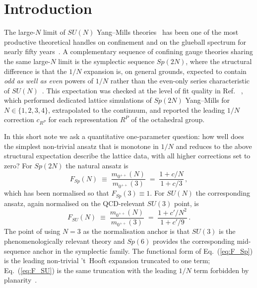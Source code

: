 \documentclass[aps,prd,reprint,nofootinbib,superscriptaddress,floatfix]{revtex4-2}
\begin{document}
\section{Introduction}
The large-$N$ limit of $SU(N)$ Yang--Mills theories~\cite{tHooft1974,Witten1979}
has been one of the most productive theoretical handles on confinement and on
the glueball spectrum for nearly fifty years~\cite{LuciniPanero2013}.
A complementary sequence of confining gauge theories sharing the same large-$N$
limit is the symplectic sequence $Sp(2N)$, where the structural difference is
that the $1/N$ expansion is, on general grounds, expected to contain
\emph{odd as well as even} powers of $1/N$ rather than the even-only series
characteristic of $SU(N)$~\cite{BennettHolligan2021}.
This expectation was checked at the level of fit quality in Ref.~%
\cite{BennettHolligan2021}, which performed dedicated lattice simulations
of $Sp(2N)$ Yang--Mills for $N \in \{1,2,3,4\}$, extrapolated to the
continuum, and reported the leading $1/N$ correction $c_{R^{P}}$ for each
representation $R^P$ of the octahedral group.

In this short note we ask a quantitative one-parameter question: how well does
the simplest non-trivial ansatz that is monotone in $1/N$ and reduces to the
above structural expectation describe the lattice data, with all higher
corrections set to zero?
For $Sp(2N)$ the natural ansatz is
\begin{equation}
   F_{Sp}(N) \;\equiv\; \frac{m_{0^{++}}(N)}{m_{0^{++}}(3)}
   \;=\; \frac{1 + c/N}{1 + c/3}\,,
   \label{eq:F_Sp}
\end{equation}
which has been normalised so that $F_{Sp}(3) \equiv 1$.
For $SU(N)$ the corresponding ansatz, again normalised on the QCD-relevant
$SU(3)$ point, is
\begin{equation}
   F_{SU}(N) \;\equiv\; \frac{m_{0^{++}}(N)}{m_{0^{++}}(3)}
   \;=\; \frac{1 + c'/N^{2}}{1 + c'/9}\,.
   \label{eq:F_SU}
\end{equation}
The point of using $N=3$ as the normalisation anchor is that $SU(3)$ is the
phenomenologically relevant theory and $Sp(6)$ provides the corresponding
mid-sequence anchor in the symplectic family. The functional form of
Eq.~(\ref{eq:F_Sp}) is the leading non-trivial 't~Hooft expansion truncated
to one term; Eq.~(\ref{eq:F_SU}) is the same truncation with the leading
$1/N$ term forbidden by planarity~\cite{tHooft1974,Witten1979}.
\end{document}
